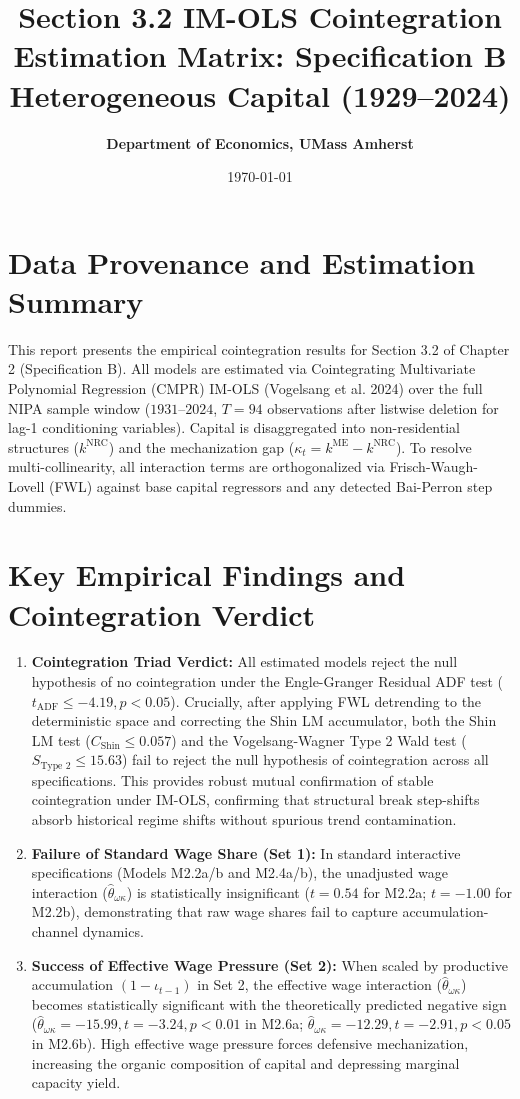\documentclass[11pt,a4paper]{article}
\title{\textbf{Section 3.2 IM-OLS Cointegration Estimation Matrix: Specification B Heterogeneous Capital (1929--2024)}}
\author{\textbf{Department of Economics, UMass Amherst}}
\date{\today}
\begin{document}
\maketitle

\section*{Data Provenance and Estimation Summary}
This report presents the empirical cointegration results for Section 3.2 of Chapter 2 (Specification B). All models are estimated via Cointegrating Multivariate Polynomial Regression (CMPR) IM-OLS (Vogelsang et al. 2024) over the full NIPA sample window ($1931$--$2024$, $T=94$ observations after listwise deletion for lag-1 conditioning variables). Capital is disaggregated into non-residential structures ($k^{\text{NRC}}$) and the mechanization gap ($\kappa_t = k^{\text{ME}} - k^{\text{NRC}}$). To resolve multi-collinearity, all interaction terms are orthogonalized via Frisch-Waugh-Lovell (FWL) against base capital regressors and any detected Bai-Perron step dummies.

\section*{Key Empirical Findings and Cointegration Verdict}
\begin{enumerate}
    \item \textbf{Cointegration Triad Verdict:} All estimated models reject the null hypothesis of no cointegration under the Engle-Granger Residual ADF test ($t_{\text{ADF}} \le -4.19, p < 0.05$). Crucially, after applying FWL detrending to the deterministic space and correcting the Shin LM accumulator, both the Shin LM test ($C_{\text{Shin}} \le 0.057$) and the Vogelsang-Wagner Type 2 Wald test ($S_{\text{Type 2}} \le 15.63$) fail to reject the null hypothesis of cointegration across all specifications. This provides robust mutual confirmation of stable cointegration under IM-OLS, confirming that structural break step-shifts absorb historical regime shifts without spurious trend contamination.
    \item \textbf{Failure of Standard Wage Share (Set 1):} In standard interactive specifications (Models M2.2a/b and M2.4a/b), the unadjusted wage interaction ($\hat{\theta}_{\omega\kappa}$) is statistically insignificant ($t = 0.54$ for M2.2a; $t = -1.00$ for M2.2b), demonstrating that raw wage shares fail to capture accumulation-channel dynamics.
    \item \textbf{Success of Effective Wage Pressure (Set 2):} When scaled by productive accumulation $(1-\iota_{t-1})$ in Set 2, the effective wage interaction ($\hat{\theta}_{\omega\kappa}$) becomes statistically significant with the theoretically predicted negative sign ($\hat{\theta}_{\omega\kappa} = -15.99, t = -3.24, p < 0.01$ in M2.6a; $\hat{\theta}_{\omega\kappa} = -12.29, t = -2.91, p < 0.05$ in M2.6b). High effective wage pressure forces defensive mechanization, increasing the organic composition of capital and depressing marginal capacity yield.
\end{enumerate}
\end{document}
